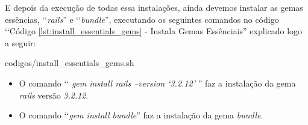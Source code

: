 E depois da execução de todas essa instalações, ainda devemos instalar as gemas essências, ‘‘\emph{rails}'' 
e ‘‘\emph{bundle}'', executando os seguintes comandos no código 
‘‘Código \ref{lst:install_essentials_gems} - Instala Gemas Essênciais'' explicado logo a seguir:
 

{codigos/install_essentials_gems.sh}

\begin{itemize}

 \item O comando ‘‘ \emph{gem install rails --version ‘3.2.12'} '' faz a instalação da gema \emph{rails}
 versão \emph{3.2.12}.
 
 \item O comando ‘‘\emph{gem install bundle}'' faz a instalação da gema \emph{bundle}.
 
\end{itemize}